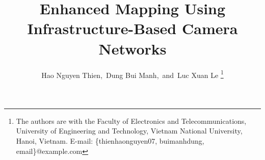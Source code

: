 \documentclass[conference]{IEEEtran}
\def\papertitle{Enhanced Mapping Using Infrastructure-Based Camera Networks}
\begin{document}
\title{\papertitle}

\author{
    Hao Nguyen Thien,~Dung Bui Manh,~and~Luc Xuan Le%
    \thanks{The authors are with the Faculty of Electronics and
    Telecommunications, University of Engineering and Technology,
    Vietnam National University, Hanoi, Vietnam.
    E-mail: \{thienhaonguyen07, buimanhdung, email\}@example.com}
}

\IEEEoverridecommandlockouts   %
\maketitle













\end{document}
